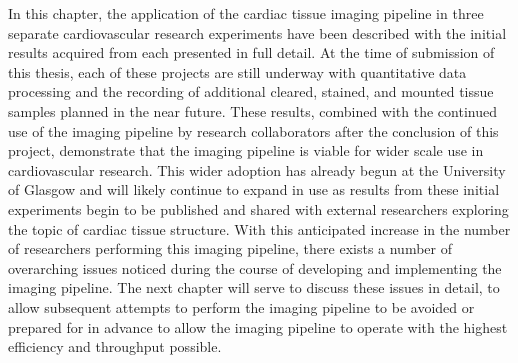 In this chapter, the application of the cardiac tissue imaging pipeline in three separate cardiovascular research experiments have been described with the initial results acquired from each presented in full detail. At the time of submission of this thesis, each of these projects are still underway with quantitative data processing and the recording of additional cleared, stained, and mounted tissue samples planned in the near future. These results, combined with the continued use of the imaging pipeline by research collaborators after the conclusion of this project, demonstrate that the imaging pipeline is viable for wider scale use in cardiovascular research. This wider adoption has already begun at the University of Glasgow and will likely continue to expand in use as results from these initial experiments begin to be published and shared with external researchers exploring the topic of cardiac tissue structure. With this anticipated increase in the number of researchers performing this imaging pipeline, there exists a number of overarching issues noticed during the course of developing and implementing the imaging pipeline. The next chapter will serve to discuss these issues in detail, to allow subsequent attempts to perform the imaging pipeline to be avoided or prepared for in advance to allow the imaging pipeline to operate with the highest efficiency and throughput possible. 